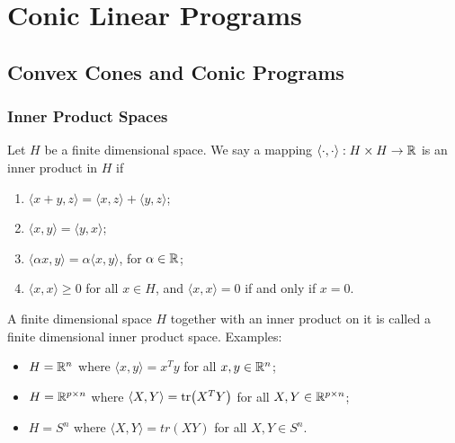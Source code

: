 \chapter{Conic Linear Programs}

\section{Convex Cones and Conic Programs}

\subsection{Inner Product Spaces}

Let \(H\) be a finite dimensional space. We say a mapping \(\langle \cdot, \cdot \rangle: H \times H \to \mathbb{R}\) is an inner product in \(H\) if
\begin{enumerate}[label=(\arabic*)]
    \item \(\langle x + y, z \rangle = \langle x, z \rangle + \langle y, z \rangle\);
    \item \(\langle x, y \rangle = \langle y, x \rangle\);
    \item \(\langle \alpha x, y \rangle = \alpha \langle x, y \rangle\), for \(\alpha \in \mathbb{R}\);
    \item \(\langle x, x \rangle \geq 0\) for all \(x \in H\), and \(\langle x, x \rangle = 0\) if and only if \(x = 0\).
\end{enumerate}

A finite dimensional space \(H\) together with an inner product on it is called a finite dimensional inner product space. Examples:

\begin{itemize}
    \item \(H = \mathbb{R}^n\) where \(\langle x, y \rangle = x^T y\) for all \(x, y \in \mathbb{R}^n\);
    \item \(H = \mathbb{R}^{p \times n}\) where \(\langle X, Y \rangle = \tr(X^T Y)\) for all \(X, Y \in \mathbb{R}^{p \times n}\);
    \item \(H = S^n\) where \(\langle X, Y \rangle = tr(XY)\) for all \(X, Y \in S^n\).
\end{itemize}




